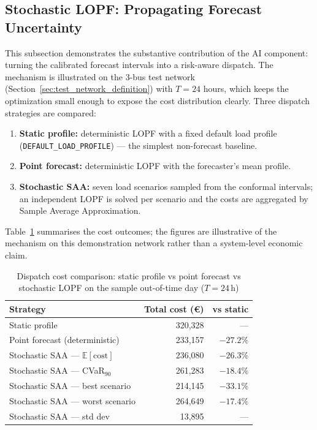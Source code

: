\subsection{Stochastic LOPF: Propagating Forecast Uncertainty}

This subsection demonstrates the substantive contribution of the AI component: turning the calibrated forecast intervals into a risk-aware dispatch. The mechanism is illustrated on the 3-bus test network (Section~\ref{sec:test_network_definition}) with $T = 24$ hours, which keeps the optimization small enough to expose the cost distribution clearly. Three dispatch strategies are compared:

\begin{enumerate}
    \item \textbf{Static profile:} deterministic LOPF with a fixed default load profile (\texttt{DEFAULT\_LOAD\_PROFILE}) --- the simplest non-forecast baseline.
    \item \textbf{Point forecast:} deterministic LOPF with the forecaster's mean profile.
    \item \textbf{Stochastic SAA:} seven load scenarios sampled from the conformal intervals; an independent LOPF is solved per scenario and the costs are aggregated by Sample Average Approximation.
\end{enumerate}

Table~\ref{tab:stochastic_results} summarises the cost outcomes; the figures are illustrative of the mechanism on this demonstration network rather than a system-level economic claim.

\begin{table}[H]
\centering
\caption{Dispatch cost comparison: static profile vs point forecast vs stochastic LOPF on the sample out-of-time day ($T=24$\,h)}
\label{tab:stochastic_results}
\begin{tabular}{lrr}
\toprule
\textbf{Strategy} & \textbf{Total cost (\euro)} & \textbf{vs static} \\
\midrule
Static profile                    & 320{,}328 & --- \\
Point forecast (deterministic)    & 233{,}157 & $-27.2\%$ \\
Stochastic SAA --- $\mathbb{E}[\text{cost}]$ & 236{,}080 & $-26.3\%$ \\
Stochastic SAA --- CVaR$_{90}$              & 261{,}283 & $-18.4\%$ \\
Stochastic SAA --- best scenario            & 214{,}145 & $-33.1\%$ \\
Stochastic SAA --- worst scenario           & 264{,}649 & $-17.4\%$ \\
Stochastic SAA --- std dev                  & 13{,}895 & --- \\
\bottomrule
\end{tabular}
\end{table}

